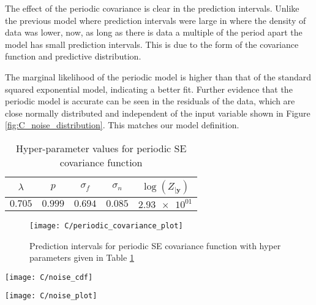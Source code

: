 \documentclass[11pt, twocolumn]{article}
\begin{document}
The effect of the periodic covariance is clear in the prediction intervals. Unlike the previous model where prediction intervals were large in where the density of data was lower, now, as long as there is data a multiple of the period apart the model has small prediction intervals. This is due to the form of the covariance function and predictive distribution.

The marginal likelihood of the periodic model is higher than that of the standard squared exponential model, indicating a better fit. Further evidence that the periodic model is accurate can be seen in the residuals of the data, which are close normally distributed and independent of the input variable shown in Figure \ref{fig:C_noise_distribution}. This matches our model definition.

\begin{table}[h]
    \centering
    \small
    \begin{tabular}{|c|c|c|c|c|}
        \hline
        $\lambda$ & $p$ & $\sigma_f$ & $\sigma_n$ & $\log(Z_{|\textbf{y}})$ \\
        \hline
        $0.705$ & $0.999$ & $0.694$ & $0.085$ & $\num{2.93e+01}$ \\ 
        \hline
    \end{tabular}
    \caption{Hyper-parameter values for periodic SE covariance function}
    \label{table:C_periodic_covariance_hyper_parameters}
\end{table}

\begin{figure}[h]
    \centering
    \texttt{[image: C/periodic\_covariance\_plot]}
    \caption{Prediction intervals for periodic SE covariance function with hyper parameters given in Table \ref{table:C_periodic_covariance_hyper_parameters}}
    \label{fig:B_periodic_covariance_prediction_intervals}
\end{figure}

\begin{figure*}[h]
    \centering
    \begin{minipage}{0.5\textwidth}
        \centering
        \texttt{[image: C/noise\_cdf]} %
    \end{minipage}%
    \begin{minipage}{0.5\textwidth}
        \centering
        \texttt{[image: C/noise\_plot]} %
    \end{minipage}
    \caption{Left: CDF of residuals of data from periodic SE GP, Right: Residuals of data from periodic SE GP}
    \label{fig:C_noise_distribution}
\end{figure*}
\end{document}
